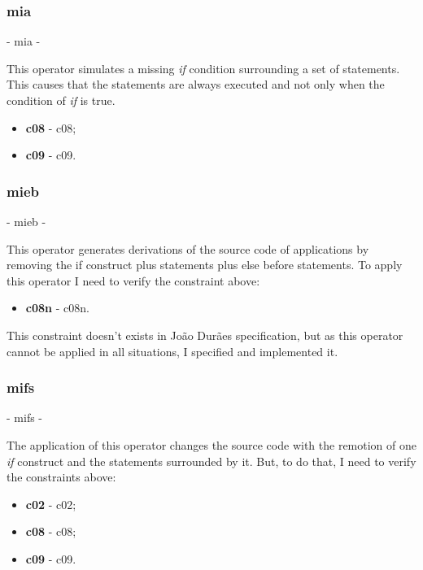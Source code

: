 	\subsubsection{\textbf{\acs{mia}}} - \Acl{mia} - 
	\hypertarget{mia}{}

	This operator simulates a missing \textit{if} condition surrounding a set of statements. This causes that the statements are always executed and not only when the condition of \textit{if} is true.
	\begin{itemize}
		\item \textbf{\acs{c08}} - \Acl{c08};
		\item \textbf{\acs{c09}} - \Acl{c09}.
	\end{itemize}

	\subsubsection{\textbf{\acs{mieb}}} - \Acl{mieb} - 
	\hypertarget{mieb}{}

	This operator generates derivations of the source code of applications by removing the if construct plus statements plus else before statements. To apply this operator I need to verify the constraint above:
	\begin{itemize}
		\item \textbf{\acs{c08n}} - \Acl{c08n}.
	\end{itemize}

	This constraint doesn't exists in João Durães specification, but as this operator cannot be applied in all situations, I specified and implemented it.

	\subsubsection{\textbf{\acs{mifs}}} - \Acl{mifs} - 
	\hypertarget{mifs}{}

	The application of this operator changes the source code with the remotion of one \textit{if} construct and the statements surrounded by it.
	But, to do that, I need to verify the constraints above:
	\begin{itemize}
		\item \textbf{\acs{c02}} - \Acl{c02};
		\item \textbf{\acs{c08}} - \Acl{c08};
		\item \textbf{\acs{c09}} - \Acl{c09}.
	\end{itemize}

